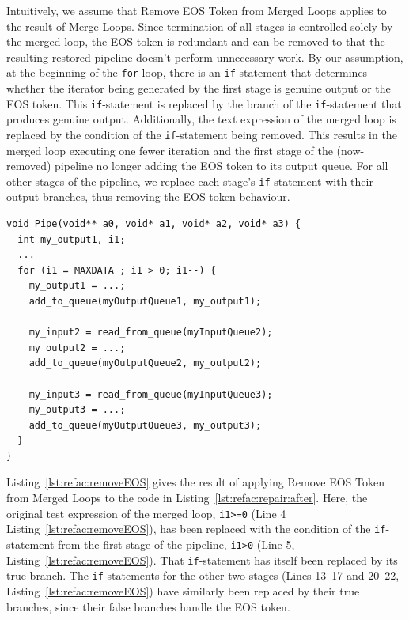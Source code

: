 Intuitively, we assume that Remove EOS Token from Merged Loops applies to the result of Merge Loops. Since termination of all stages is controlled solely by the merged loop, the EOS token is redundant and can be removed to that the resulting restored pipeline doesn't perform unnecessary work.
%
By our assumption, at the beginning of the \lstinline|for|-loop, there is an \lstinline|if|-statement that determines whether the iterator being generated by the first stage is genuine output or the EOS token. This \lstinline|if|-statement is replaced by the branch of the \lstinline|if|-statement that produces genuine output. Additionally, the text expression of the merged loop is replaced by the condition of the \lstinline|if|-statement being removed. This results in the merged loop executing one fewer iteration and the first stage of the (now-removed) pipeline no longer adding the EOS token to its output queue.
%
For all other stages of the pipeline, we replace each stage's \lstinline|if|-statement with their output branches, thus removing the EOS token behaviour.

\begin{lstlisting}[caption=Following application of Remove EOS Token from Merged Loops to Listing~\ref{lst:refac:repair:after}, label=lst:refac:removeEOS]
void Pipe(void** a0, void* a1, void* a2, void* a3) {
  int my_output1, i1;
  ...
  for (i1 = MAXDATA ; i1 > 0; i1--) {
    my_output1 = ...;
    add_to_queue(myOutputQueue1, my_output1);

    my_input2 = read_from_queue(myInputQueue2);
    my_output2 = ...;
    add_to_queue(myOutputQueue2, my_output2);

    my_input3 = read_from_queue(myInputQueue3);
    my_output3 = ...;
    add_to_queue(myOutputQueue3, my_output3);
  }
}
\end{lstlisting}
%
\noindent
Listing~\ref{lst:refac:removeEOS} gives the result of applying Remove EOS Token from Merged Loops to the code in Listing~\ref{lst:refac:repair:after}. Here, the original test expression of the merged loop, \lstinline|i1>=0| (Line 4 Listing~\ref{lst:refac:removeEOS}), has been replaced with the condition of the \lstinline|if|-statement from the first stage of the pipeline, \lstinline|i1>0| (Line 5, Listing~\ref{lst:refac:removeEOS}). That \lstinline|if|-statement has itself been replaced by its true branch. The \lstinline|if|-statements for the other two stages (Lines 13--17 and 20--22, Listing~\ref{lst:refac:removeEOS}) have similarly been replaced by their true branches, since their false branches handle the EOS token.

